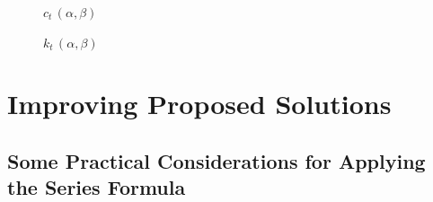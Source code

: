 \documentclass[12pt]{article}
\begin{document}
\begin{figure}
  \centering
  \caption{$c_t\, (\alpha,\beta)$ \label{fig:forcn}}
  
\end{figure}


\begin{figure}
  \centering
  \caption{$k_t\, (\alpha,\beta) $   \label{fig:forkn} }

\end{figure}






\clearpage
\section{Improving Proposed  Solutions}
\label{sec:algoforsoln}


\subsection{Some Practical Considerations for Applying the Series Formula}
\label{sec:practicalformula}



\end{document}
